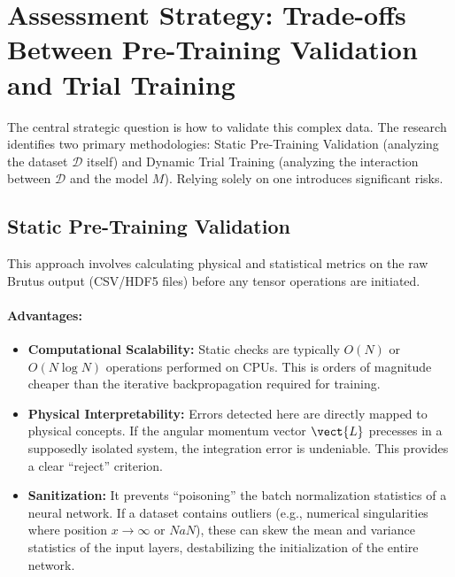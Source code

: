 \section{Assessment Strategy: Trade-offs Between Pre-Training Validation and Trial Training}

The central strategic question is how to validate this complex data. The research identifies two primary methodologies: Static Pre-Training Validation (analyzing the dataset $\mathcal{D}$ itself) and Dynamic Trial Training (analyzing the interaction between $\mathcal{D}$ and the model $M$). Relying solely on one introduces significant risks.

\subsection{Static Pre-Training Validation}

This approach involves calculating physical and statistical metrics on the raw Brutus output (CSV/HDF5 files) before any tensor operations are initiated.

\paragraph{Advantages:}
\begin{itemize}
    \item \textbf{Computational Scalability:} Static checks are typically $O(N)$ or $O(N \log N)$ operations performed on CPUs. This is orders of magnitude cheaper than the iterative backpropagation required for training.
    \item \textbf{Physical Interpretability:} Errors detected here are directly mapped to physical concepts. If the angular momentum vector $\vect{L}$ precesses in a supposedly isolated system, the integration error is undeniable. This provides a clear ``reject'' criterion.
    \item \textbf{Sanitization:} It prevents ``poisoning'' the batch normalization statistics of a neural network. If a dataset contains outliers (e.g., numerical singularities where position $x \to \infty$ or $NaN$), these can skew the mean and variance statistics of the input layers, destabilizing the initialization of the entire network.
\end{itemize}

